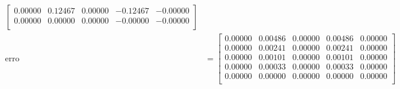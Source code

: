 \documentclass[a4paper, 11pt]{report}
\begin{document}
\begin{enumerate}[leftmargin=*]
\begin{minipage}{0.6\columnwidth}
\begin{align*}
\begin{bmatrix}
                0.00000 &  0.12467 &  0.00000 &  -0.12467  & -0.00000  \\
                0.00000 &  0.00000 &  0.00000 &  -0.00000  & -0.00000  \\
            \end{bmatrix}\\
            \text{erro} &= 
            \begin{bmatrix}
                0.00000  & 0.00486  & 0.00000  & 0.00486 &  0.00000\\  
                0.00000  & 0.00241  & 0.00000  & 0.00241 &  0.00000\\  
                0.00000  & 0.00101  & 0.00000  & 0.00101 &  0.00000\\  
                0.00000  & 0.00033  & 0.00000  & 0.00033 &  0.00000\\  
                0.00000  & 0.00000  & 0.00000  & 0.00000 &  0.00000\\  
            \end{bmatrix}
        \end{align*}
    \end{minipage}
\end{enumerate}
\end{document}
